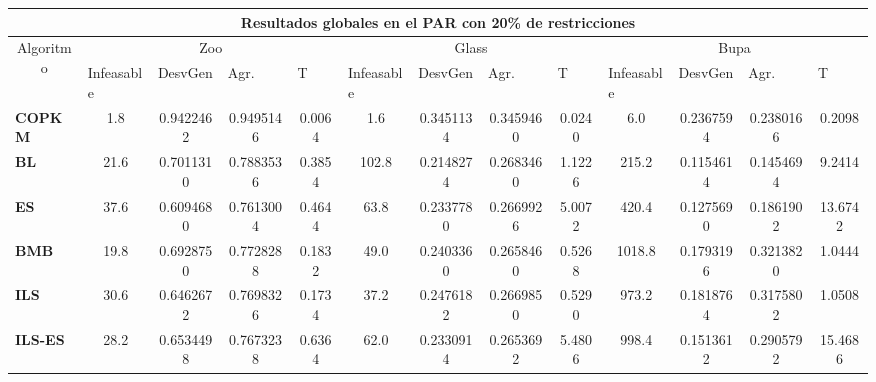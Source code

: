 \begin{table}[H]
\begin{adjustwidth}{-1cm}{-1cm}
	\begin{tabular}{|l|c|c|c|c|c|c|c|c|c|c|c|c|}
	\hline
	\multicolumn{13}{|c|}{\textbf{Resultados globales en el PAR con 20\% de restricciones}}                                                                                                                                                                                                                                                                                                                                            \\ \hline
	\multicolumn{1}{|c|}{\multirow{2}{*}{Algoritmo}} & \multicolumn{4}{c|}{Zoo}                                                                                          & \multicolumn{4}{c|}{Glass}                                                                                         & \multicolumn{4}{c|}{Bupa}                                                                                          \\ \cline{2-13} 
	\multicolumn{1}{|c|}{}                                  & \multicolumn{1}{l|}{Infeasable} & \multicolumn{1}{l|}{DesvGen} & \multicolumn{1}{l|}{Agr.} & \multicolumn{1}{l|}{T} & \multicolumn{1}{l|}{Infeasable} & \multicolumn{1}{l|}{DesvGen} & \multicolumn{1}{l|}{Agr.} & \multicolumn{1}{l|}{T} & \multicolumn{1}{l|}{Infeasable} & \multicolumn{1}{l|}{DesvGen} & \multicolumn{1}{l|}{Agr.} & \multicolumn{1}{l|}{T} \\ \hline
	\textbf{COPKM}	& 1.8 & 0.9422462 &  0.9495146  & 0.0064      						 & 1.6 & 0.3451134 & 0.3459460 & 0.0240     & 6.0 & 0.2367594 & 0.2380166 & 0.2098  \\ \hline
	\textbf{BL}  	& 21.6 & 0.7011310 & 0.7883536 & 0.3854     							& 102.8 & 0.2148274 & 0.2683460 & 1.1226 & 215.2 & 0.1154614 & 0.1454694 & 9.2414 		\\ \hline
	\textbf{ES}   	& 37.6 &	0.6094680&	0.7613004	&0.4644	&63.8&	0.2337780&	0.2669926&	5.0072&	420.4 & 0.1275690&	0.1861902	& 13.6742		\\ \hline
	\textbf{BMB}   	&  19.8	&0.6928750	&0.7728288&	0.1832&	49.0&	0.2403360	&0.2658460	&0.5268&	1018.8	&0.1793196&	0.3213820	& 1.0444	\\ \hline
	\textbf{ILS}    &  30.6	&0.6462672	&0.7698326&	0.1734&	37.2&	0.2476182&	0.2669850	&0.5290	&973.2	&0.1818764	&0.3175802	&1.0508	\\ \hline
	\textbf{ILS-ES}	&  28.2&	0.6534498	&0.7673238	&0.6364&	62.0	&0.2330914	&0.2653692	&5.4806&	998.4	&0.1513612	&0.2905792	&15.4686 		\\ \hline
	\end{tabular}
	
	\end{adjustwidth}
	
\end{table}

